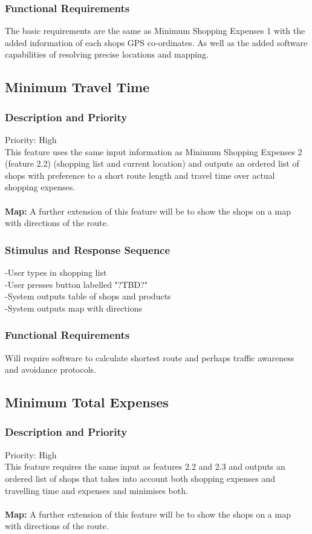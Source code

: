 \documentclass[12pt]{article}
\begin{document}
 \subsubsection{Functional Requirements}
 The basic requirements are the same as Minimum Shopping Expenses 1 with the added information of each shops GPS co-ordinates. As well as the added software capabilities of resolving precise locations and mapping.
 
 \subsection{Minimum Travel Time}
\subsubsection{Description and Priority}
 Priority: High\\
 This feature uses the same input information as Minimum Shopping Expenses 2 (feature 2.2) (shopping list and current location) and outputs an ordered list of shops with preference to a short route length and travel time over actual shopping expenses.  
\\\\
\textbf{Map:} A further extension of this feature will be to show the shops on a map with directions of the route.
 \subsubsection{Stimulus and Response Sequence}
-User types in shopping list\\
-User presses button labelled "?TBD?"\\
-System outputs table of shops and products\\
-System outputs map with directions\\ \subsubsection{Functional Requirements}
Will require software to calculate shortest route and perhaps traffic awareness and avoidance  protocols.
 
 \subsection{Minimum Total Expenses}
\subsubsection{Description and Priority}
 Priority: High\\
 This feature requires the same input as features 2.2 and 2.3 and outputs an ordered list of shops that takes into account both shopping expenses and travelling time and expenses and minimises both. 
 \\\\
\textbf{Map:} A further extension of this feature will be to show the shops on a map with directions of the route.
\end{document}
